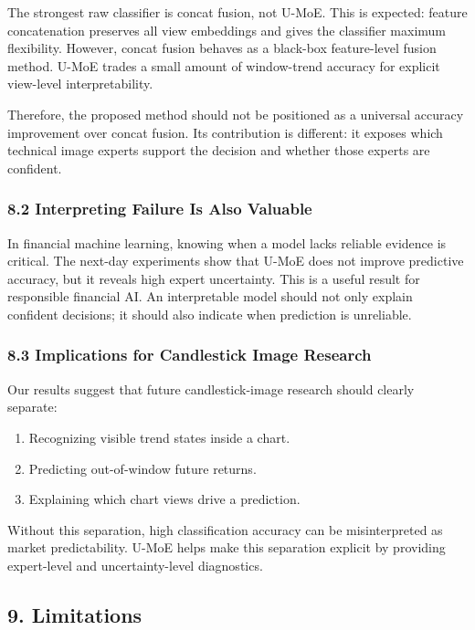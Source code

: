 \documentclass[
]{article}
\providecommand{\tightlist}{%
  \setlength{\itemsep}{0pt}\setlength{\parskip}{0pt}}
\begin{document}
The strongest raw classifier is concat fusion, not U-MoE. This is
expected: feature concatenation preserves all view embeddings and gives
the classifier maximum flexibility. However, concat fusion behaves as a
black-box feature-level fusion method. U-MoE trades a small amount of
window-trend accuracy for explicit view-level interpretability.

Therefore, the proposed method should not be positioned as a universal
accuracy improvement over concat fusion. Its contribution is different:
it exposes which technical image experts support the decision and
whether those experts are confident.

\subsubsection{8.2 Interpreting Failure Is Also
Valuable}\label{interpreting-failure-is-also-valuable}

In financial machine learning, knowing when a model lacks reliable
evidence is critical. The next-day experiments show that U-MoE does not
improve predictive accuracy, but it reveals high expert uncertainty.
This is a useful result for responsible financial AI. An interpretable
model should not only explain confident decisions; it should also
indicate when prediction is unreliable.

\subsubsection{8.3 Implications for Candlestick Image
Research}\label{implications-for-candlestick-image-research}

Our results suggest that future candlestick-image research should
clearly separate:

\begin{enumerate}
\def\labelenumi{\arabic{enumi}.}
\tightlist
\item
  Recognizing visible trend states inside a chart.
\item
  Predicting out-of-window future returns.
\item
  Explaining which chart views drive a prediction.
\end{enumerate}

Without this separation, high classification accuracy can be
misinterpreted as market predictability. U-MoE helps make this
separation explicit by providing expert-level and uncertainty-level
diagnostics.

\subsection{9. Limitations}\label{limitations}
\end{document}
